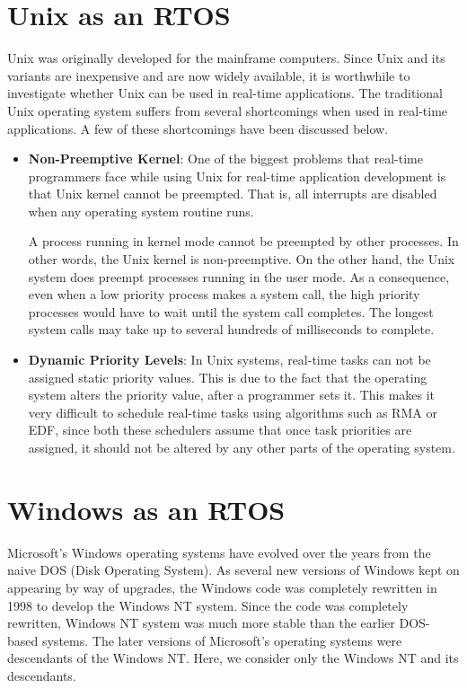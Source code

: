 \documentclass[12pt]{report}
\begin{document}
 \section{Unix as an RTOS}
 Unix was originally developed for the mainframe computers. Since Unix and its variants are inexpensive and are now widely available, it is worthwhile to investigate whether Unix can be used in real-time applications. The traditional Unix operating system suffers from several shortcomings when used in real-time applications. A few of these shortcomings have been discussed below. 
 \begin{itemize}
     \item \textbf{Non-Preemptive Kernel}: One of the biggest problems that real-time programmers face while using Unix for real-time application development is that Unix kernel cannot be preempted. That is, all interrupts are disabled when any operating system routine runs. 
     
     A process running in kernel mode cannot be preempted by other processes. In other words, the Unix kernel is non-preemptive. On the other hand, the Unix system does preempt processes running in the user mode. As a consequence, even when a low priority process makes a system call, the high priority processes would have to wait until the system call completes. The longest system calls may take up to several hundreds of milliseconds to complete. 
     \item \textbf{Dynamic Priority Levels}: In Unix systems, real-time tasks can not be assigned static priority values. This is due to the fact that the operating system alters the priority value, after a programmer sets it. This makes it very difficult to schedule real-time tasks using algorithms such as RMA or EDF, since both these schedulers assume that once task priorities are assigned, it should not be altered by any other parts of the operating system. 
 \end{itemize}
 
\section{Windows as an RTOS}
Microsoft’s Windows operating systems have evolved over the years from the naive DOS (Disk Operating System). As several new versions of Windows kept on appearing by way of upgrades, the Windows code was completely rewritten in 1998 to develop the Windows NT system. Since the code was completely rewritten, Windows NT system was much more stable than the earlier DOS-based systems. The later versions of Microsoft’s operating systems were descendants of the Windows NT. Here, we consider only the Windows NT and its descendants.\\
\end{document}
